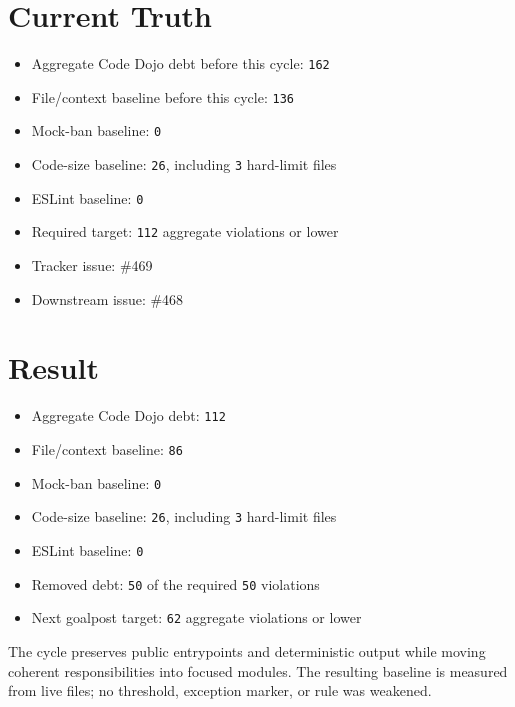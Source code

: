 \section{Current Truth}\label{record-245-current-truth}

\begin{itemize}
\tightlist
\item
  Aggregate Code Dojo debt before this cycle: \texttt{1\allowbreak{}6\allowbreak{}2}
\item
  File/context baseline before this cycle: \texttt{1\allowbreak{}3\allowbreak{}6}
\item
  Mock-ban baseline: \texttt{0}
\item
  Code-size baseline: \texttt{2\allowbreak{}6}, including \texttt{3} hard-limit files
\item
  ESLint baseline: \texttt{0}
\item
  Required target: \texttt{1\allowbreak{}1\allowbreak{}2} aggregate violations or lower
\item
  Tracker issue: \#469
\item
  Downstream issue: \#468
\end{itemize}

\section{Result}\label{record-245-result}

\begin{itemize}
\tightlist
\item
  Aggregate Code Dojo debt: \texttt{1\allowbreak{}1\allowbreak{}2}
\item
  File/context baseline: \texttt{8\allowbreak{}6}
\item
  Mock-ban baseline: \texttt{0}
\item
  Code-size baseline: \texttt{2\allowbreak{}6}, including \texttt{3} hard-limit files
\item
  ESLint baseline: \texttt{0}
\item
  Removed debt: \texttt{5\allowbreak{}0} of the required \texttt{5\allowbreak{}0} violations
\item
  Next goalpost target: \texttt{6\allowbreak{}2} aggregate violations or lower
\end{itemize}

The cycle preserves public entrypoints and deterministic output while moving coherent responsibilities into focused modules. The resulting baseline is measured from live files; no threshold, exception marker, or rule was weakened.

